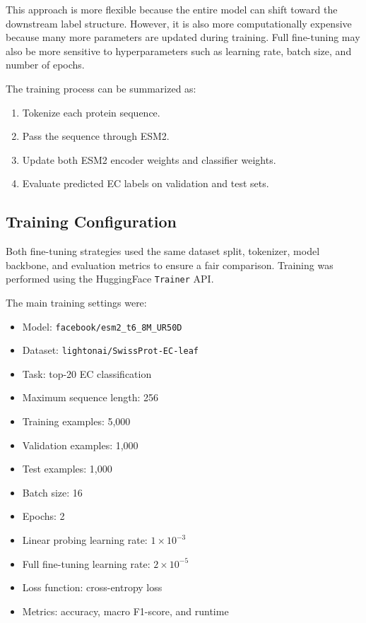 \documentclass{article}
\begin{document}
This approach is more flexible because the entire model can shift toward the downstream label structure. However, it is also more computationally expensive because many more parameters are updated during training. Full fine-tuning may also be more sensitive to hyperparameters such as learning rate, batch size, and number of epochs.

The training process can be summarized as:
\begin{enumerate}
    \item Tokenize each protein sequence.
    \item Pass the sequence through ESM2.
    \item Update both ESM2 encoder weights and classifier weights.
    \item Evaluate predicted EC labels on validation and test sets.
\end{enumerate}

\subsection{Training Configuration}

Both fine-tuning strategies used the same dataset split, tokenizer, model backbone, and evaluation metrics to ensure a fair comparison. Training was performed using the HuggingFace \texttt{Trainer} API.

The main training settings were:
\begin{itemize}
    \item Model: \texttt{facebook/esm2\_t6\_8M\_UR50D}
    \item Dataset: \texttt{lightonai/SwissProt-EC-leaf}
    \item Task: top-20 EC classification
    \item Maximum sequence length: 256
    \item Training examples: 5,000
    \item Validation examples: 1,000
    \item Test examples: 1,000
    \item Batch size: 16
    \item Epochs: 2
    \item Linear probing learning rate: \(1 \times 10^{-3}\)
    \item Full fine-tuning learning rate: \(2 \times 10^{-5}\)
    \item Loss function: cross-entropy loss
    \item Metrics: accuracy, macro F1-score, and runtime
\end{itemize}
\end{document}
